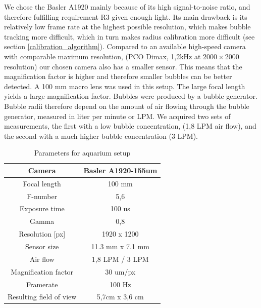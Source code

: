 		We chose the Basler A1920 mainly because of its high signal-to-noise ratio, and therefore fulfilling requirement R3 given enough light. Its main drawback is its relatively low frame rate at the highest possible resolution, which makes bubble tracking more difficult, which in turn makes radius calibration more difficult (see section \ref{calibration_algorithm}). Compared to an available high-speed camera with comparable maximum resolution, (PCO Dimax, 1,2kHz at $2000 \times 2000$ resolution) our chosen camera also has a smaller sensor. This means that the magnification factor is higher and therefore smaller bubbles can be better detected. A 100 mm macro lens was used in this setup. The large focal length yields a large magnification factor.
	Bubbles were produced by a bubble generator. Bubble radii therefore depend on the amount of air flowing through the bubble generator, measured in liter per minute or LPM. We acquired two sets of measurements, the first with a low bubble concentration, (1,8 LPM air flow), and the second with a much higher bubble concentration (3 LPM). 
		
		\begin{table}
			\centering
		
			\begin{tabular}{|c|c|}
			\hline 
			Camera & Basler A1920-155um \\ 
			\hline 
			Focal length & 100 mm \\ 
			\hline 
			F-number & 5,6 \\ 
			\hline 
			Exposure time & 100 us \\ 
			\hline 
			Gamma & 0,8 \\
			\hline
			Resolution [px] &1920 x 1200 \\
			\hline 
			Sensor size & 11.3 mm x 7.1 mm \\
			\hline
			Air flow & 1,8 LPM / 3 LPM \\ 
			\hline 
			Magnification factor & 30 um/px \\ 
			\hline 
			Framerate & 100 Hz \\ 
			\hline 
			Resulting field of view & 5,7cm x 3,6 cm \\
			\hline
			\end{tabular} 
			
			\caption{Parameters for aquarium setup}
			\label{tab:aquarium_param}

		\end{table}
		
